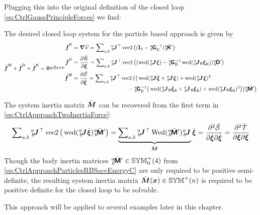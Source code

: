 Plugging this into the original definition of the closed loop \eqref{eq:CtrlGaussPrincipleForces} we find:
\begin{RedBox}
The desired closed loop system for the particle based approach is given by 
\begin{subequations}\label{eq:CtrlApproachParticles}
\begin{align}
 \genForceInertiaC + \genForceDissC + \genForceStiffC = \tuple{0}
\end{align}
where
\begin{align}
 \genForceStiffC
 &= \differential \potentialEnergyC
 = \sumBodiesAB \bodyJac{\BidxI}{\BidxII}^\top \veeTwoOp \big( (\idMat[4] - \bodyHomoCoordE{\BidxI}{\BidxII}^{-1}) \bodyStiffMatCp{\BidxI}{\BidxII} \big)
 \label{eq:GenForceStiffControlParticles}
\\
 \genForceDissC
 &= \pdiff[\dissFktC]{\sysVel}
 = \sumBodiesAB \bodyJac{\BidxI}{\BidxII}^\top \veeTwoOp \big( (\wedOp(\bodyJac{\BidxI}{\BidxII} \sysVel) - \bodyHomoCoordE{\BidxI}{\BidxII}^{-1} \wedOp(\bodyJacR{\BidxI}{\BidxII} \sysVelR)) \bodyDissMatCp{\BidxI}{\BidxII} \big)
\\
 \genForceInertiaC
 &= \pdiff[\accEnergyC]{\sysVeld}
 = \sumBodiesAB \bodyJac{\BidxI}{\BidxII}^\top \veeTwoOp \big( \big(\wedOp(\bodyJac{\BidxI}{\BidxII} \sysVeld + \bodyJacd{\BidxI}{\BidxII} \sysVel) + \wedOp(\bodyJac{\BidxI}{\BidxII} \sysVel)^2
\nonumber\\[-0.7ex]
 &\hspace{10em}- \bodyHomoCoordE{\BidxI}{\BidxII}^{-1} \big( \wedOp(\bodyJacR{\BidxI}{\BidxII}\sysVelRd + \bodyJacRd{\BidxI}{\BidxII} \sysVelR) + \wedOp(\bodyJacR{\BidxI}{\BidxII} \sysVelR)^2 \big) \big) \bodyInertiaMatCp{\BidxI}{\BidxII} \big) 
 \label{eq:CtrlApproachTwoInertiaForce}
\end{align}
\end{subequations} 
\end{RedBox}

The system inertia matrix $\bar{\boldsymbol{M}}$ can be recovered from the first term in \eqref{eq:CtrlApproachTwoInertiaForce}:
\begin{align}
 \sumBodiesAB \bodyJac{\BidxI}{\BidxII}^\top \veeTwoOp \big(\wedOp(\bodyJac{\BidxI}{\BidxII} \sysVeld) \bodyInertiaMatCp{\BidxI}{\BidxII} \big) 
 = \underbrace{\sumBodiesAB \bodyJac{\BidxI}{\BidxII}^\top \wedMatOp(\bodyInertiaMatCp{\BidxI}{\BidxII}) \bodyJac{\BidxI}{\BidxII}}_{\sysInertiaMatC} \sysVeld
 = \frac{\partial^2 \accEnergyC}{\partial\sysVeld \partial\sysVeld}
 = \frac{\partial^2 \kineticEnergyC}{\partial\sysVel \partial\sysVel}
\end{align}
Though the body inertia matrices $\bodyInertiaMatCp{\BidxI}{\BidxII} \in \SymMatSP(4)$ from \eqref{eq:CtrlApproachParticlesRBSaccEnergyC} are only required to be positive semi-definite, the resulting system inertia matrix $\bar{\boldsymbol{M}}(\boldsymbol{x})\in\mathbb{SYM}^{+}(n)$ is required to be positive definite for the closed loop to be solvable.

This approach will be applied to several examples later in this chapter.
